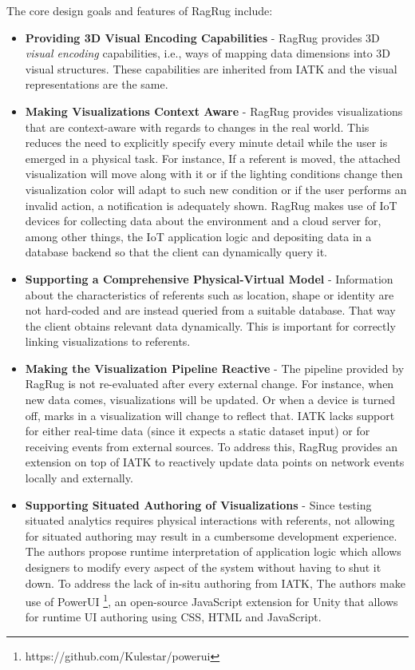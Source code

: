 \documentclass{vgtc}                          %
\begin{document}
\noindent The core design goals and features of RagRug include:
\begin{itemize}
	\item \textbf{Providing 3D Visual Encoding Capabilities} -
	      RagRug provides 3D \textit{visual encoding} capabilities, i.e.,
	      ways of mapping data dimensions into 3D visual structures. These
	      capabilities are inherited from IATK and the visual representations
	      are the same.
	\item \textbf{Making Visualizations Context Aware} -
	      RagRug provides visualizations that are context-aware with
	      regards to changes in the real world. This reduces the need to
	      explicitly specify every minute detail while the user is emerged in
	      a physical task. For instance, If a referent is moved, the attached
	      visualization will move along with it or if the lighting conditions
	      change then visualization color will adapt to such new condition
	      or if the user performs an invalid action, a notification is
	      adequately shown. RagRug makes use of IoT devices for collecting data
	      about the environment and a cloud server for, among other things, the
	      IoT application logic and depositing data in a database backend
	      so that the client can dynamically query it.
	\item \textbf{Supporting a Comprehensive Physical-Virtual Model} -
	      Information about the characteristics of referents such as location,
	      shape or identity are not hard-coded and are instead
	      queried from a suitable database. That way the client obtains
	      relevant data dynamically. This is important for correctly linking
	      visualizations to referents.
	\item \textbf{Making the Visualization Pipeline Reactive} -
	      The pipeline provided by RagRug is not re-evaluated after every external
          change. For instance, when new data comes, visualizations will be updated. Or
	      when a device is turned off, marks in a visualization will
	      change to reflect that. IATK lacks support for either real-time
	      data (since it expects a static dataset input) or for receiving
	      events from external sources. To address this, RagRug provides an
	      extension on top of IATK to reactively update data points on network
          events locally and externally.
	\item \textbf{Supporting Situated Authoring of Visualizations} -
	      Since testing situated analytics requires physical interactions with
	      referents, not allowing for situated authoring may result in a
	      cumbersome development experience. The authors propose runtime
	      interpretation of application logic which allows designers to modify
	      every aspect of the system without having to shut it down. To address
	      the lack of in-situ authoring from IATK, The authors make use of
	      PowerUI \footnote{https://github.com/Kulestar/powerui}, an
	      open-source JavaScript extension for Unity that allows for runtime UI
	      authoring using CSS, HTML and JavaScript.
\end{itemize}
\end{document}
